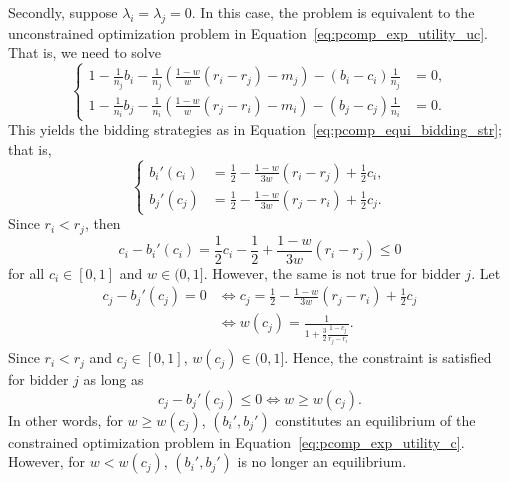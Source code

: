 Secondly, suppose $\lambda_i=\lambda_j=0$. In this case, the problem is equivalent to the unconstrained optimization problem in Equation~\eqref{eq:pcomp_exp_utility_uc}. That is, we need to solve
\begin{equation*}
	\left\{
	\begin{array}{ll}
		1 - \displaystyle\frac{1}{n_j}b_i - \displaystyle\frac{1}{n_j}\left( \displaystyle\frac{1-w}{w}(r_i-r_j) - m_j \right) - (b_i-c_i)\displaystyle\frac{1}{n_j} &= 0,\\[2ex]
		1 - \displaystyle\frac{1}{n_i}b_j - \displaystyle\frac{1}{n_i}\left( \displaystyle\frac{1-w}{w}(r_j-r_i) - m_i \right) - (b_j-c_j)\displaystyle\frac{1}{n_i} &= 0.
	\end{array}
	\right.
\end{equation*}
This yields the bidding strategies as in Equation~\eqref{eq:pcomp_equi_bidding_str}; that is,
\begin{equation*}
	\left\{
	\begin{array}{ll}
		b_i'(c_i) &= \displaystyle\frac{1}{2} - \displaystyle\frac{1-w}{3w}(r_i-r_j) + \displaystyle\frac{1}{2}c_i,\\[2ex]
		b_j'(c_j) &= \displaystyle\frac{1}{2} - \displaystyle\frac{1-w}{3w}(r_j-r_i) + \displaystyle\frac{1}{2}c_j.
	\end{array}
	\right.
\end{equation*}
Since $r_i < r_j$, then
\begin{equation*}
	c_i - b_i'(c_i) = \frac{1}{2}c_i - \frac{1}{2} + \frac{1-w}{3w}(r_i-r_j) \le 0
\end{equation*}
for all $c_i\in[0,1]$ and $w\in(0,1]$. However, the same is not true for bidder $j$. Let
\begin{align*}
	c_j - b_j'(c_j) = 0 &\iff c_j = \frac{1}{2} - \frac{1-w}{3w}(r_j-r_i) + \frac{1}{2}c_j\\[2ex]
	&\iff w(c_j) = \frac{1}{1 + \frac{3}{2}\frac{1-c_j}{r_j-r_i}}.
\end{align*}
Since $r_i < r_j$ and $c_j\in[0,1]$, $w(c_j)\in(0,1]$. Hence, the constraint is satisfied for bidder $j$ as long as
\begin{equation*}
	c_j-b_j'(c_j) \le 0 \iff w \ge w(c_j).
\end{equation*}
In other words, for $w\ge w(c_j)$, $(b_i',b_j')$ constitutes an equilibrium of the constrained optimization problem in Equation~\eqref{eq:pcomp_exp_utility_c}. However, for $w < w(c_j)$, $(b_i', b_j')$ is no longer an equilibrium.


